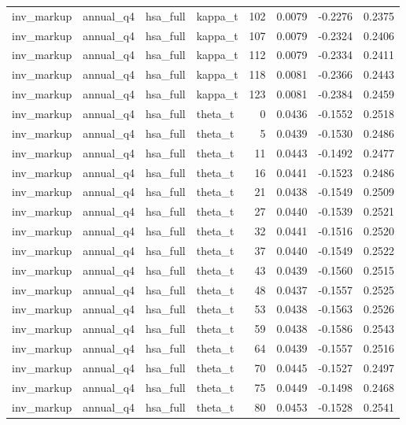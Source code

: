 \begin{tabular}{llllrrrr}
inv\_markup & annual\_q4 & hsa\_full & kappa\_t & 102 & 0.0079 & -0.2276 & 0.2375 \\
inv\_markup & annual\_q4 & hsa\_full & kappa\_t & 107 & 0.0079 & -0.2324 & 0.2406 \\
inv\_markup & annual\_q4 & hsa\_full & kappa\_t & 112 & 0.0079 & -0.2334 & 0.2411 \\
inv\_markup & annual\_q4 & hsa\_full & kappa\_t & 118 & 0.0081 & -0.2366 & 0.2443 \\
inv\_markup & annual\_q4 & hsa\_full & kappa\_t & 123 & 0.0081 & -0.2384 & 0.2459 \\
inv\_markup & annual\_q4 & hsa\_full & theta\_t & 0 & 0.0436 & -0.1552 & 0.2518 \\
inv\_markup & annual\_q4 & hsa\_full & theta\_t & 5 & 0.0439 & -0.1530 & 0.2486 \\
inv\_markup & annual\_q4 & hsa\_full & theta\_t & 11 & 0.0443 & -0.1492 & 0.2477 \\
inv\_markup & annual\_q4 & hsa\_full & theta\_t & 16 & 0.0441 & -0.1523 & 0.2486 \\
inv\_markup & annual\_q4 & hsa\_full & theta\_t & 21 & 0.0438 & -0.1549 & 0.2509 \\
inv\_markup & annual\_q4 & hsa\_full & theta\_t & 27 & 0.0440 & -0.1539 & 0.2521 \\
inv\_markup & annual\_q4 & hsa\_full & theta\_t & 32 & 0.0441 & -0.1516 & 0.2520 \\
inv\_markup & annual\_q4 & hsa\_full & theta\_t & 37 & 0.0440 & -0.1549 & 0.2522 \\
inv\_markup & annual\_q4 & hsa\_full & theta\_t & 43 & 0.0439 & -0.1560 & 0.2515 \\
inv\_markup & annual\_q4 & hsa\_full & theta\_t & 48 & 0.0437 & -0.1557 & 0.2525 \\
inv\_markup & annual\_q4 & hsa\_full & theta\_t & 53 & 0.0438 & -0.1563 & 0.2526 \\
inv\_markup & annual\_q4 & hsa\_full & theta\_t & 59 & 0.0438 & -0.1586 & 0.2543 \\
inv\_markup & annual\_q4 & hsa\_full & theta\_t & 64 & 0.0439 & -0.1557 & 0.2516 \\
inv\_markup & annual\_q4 & hsa\_full & theta\_t & 70 & 0.0445 & -0.1527 & 0.2497 \\
inv\_markup & annual\_q4 & hsa\_full & theta\_t & 75 & 0.0449 & -0.1498 & 0.2468 \\
inv\_markup & annual\_q4 & hsa\_full & theta\_t & 80 & 0.0453 & -0.1528 & 0.2541 \\

\end{tabular}
